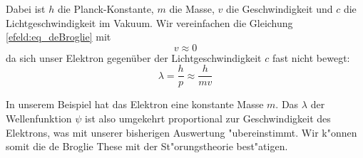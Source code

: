 \begin{refsection}
Dabei ist $h$ die Planck-Konstante, $m$ die Masse, $v$ die Geschwindigkeit
und $c$ die Lichtgeschwindigkeit im Vakuum.
Wir vereinfachen die Gleichung \ref{efeld:eq_deBroglie} mit
\[
  v \approx 0
\]
da sich unser Elektron gegen\"uber der Lichtgeschwindigkeit $c$ fast nicht bewegt:
\begin{equation}
  \lambda = \frac{h}{p} \approx \frac{h}{m v}
\end{equation}

In unserem Beispiel hat das Elektron eine konstante Masse $m$.
Das $\lambda$ der Wellenfunktion $\psi$ ist also umgekehrt proportional zur Geschwindigkeit des Elektrons,
was mit unserer bisherigen Auswertung "ubereinstimmt.
Wir k"onnen somit die de Broglie These mit der St"orungstheorie best"atigen.






\printbibliography[heading=subbibliography]
\end{refsection}
